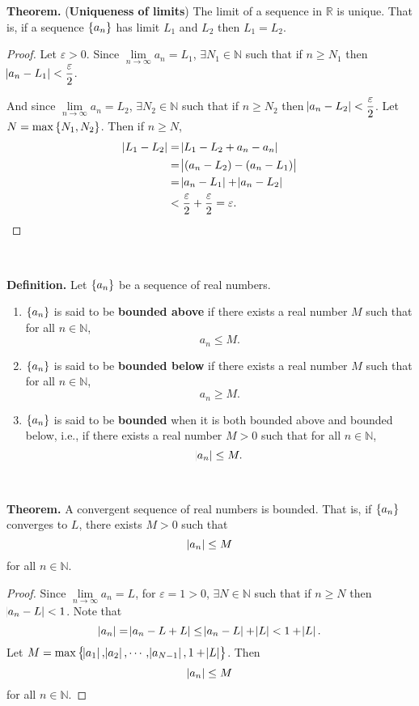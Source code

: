 \documentclass[12pt,a4paper]{article}
\newcommand{\dispsty}{\displaystyle}
\begin{document}
\begin{tcolorbox}[colback=white]
	\textbf{Theorem.} (\textbf{Uniqueness of limits}) The limit of a sequence in $\mathbb{R}$ is unique. That is, if a sequence $\set{a_n}$ has limit $L_1$ and $L_2$ then $L_1=L_2$.\tcblower\begin{proof}
		Let $\varepsilon>0$. Since $\lim\limits_{n\to\infty}a_n=L_1$, $\exists N_1\in\mathbb{N}$ such that if $n\geq N_1$ then $\dispsty\abs{a_n-L_1}<\frac{\varepsilon}{2}$. \par And since $\lim\limits_{n\to\infty}a_n=L_2$, $\exists N_2\in\mathbb{N}$ such that if $n\geq N_2$ then $\dispsty\abs{a_n-L_2}<\frac{\varepsilon}{2}$. Let $N=\max\set{N_1,N_2}$. Then if $n\geq N$, \begin{align*}
		\abs{L_1-L_2} &= \abs{L_1-L_2+a_n-a_n} \\
		&=\abs{(a_n-L_2)-(a_n-L_1)} \\
		&=\abs{a_n-L_1}+\abs{a_n-L_2} \\
		&<\frac{\varepsilon}{2}+\frac{\varepsilon}{2}=\varepsilon.
		\end{align*}
	\end{proof}
\end{tcolorbox}
\
\begin{tcolorbox}[colback=white]
	\textbf{Definition.} Let $\set{a_n}$ be a sequence of real numbers. \begin{enumerate}
		\item $\set{a_n}$ is said to be \textbf{bounded above} if there exists a real number $M$ such that for all $n\in\mathbb{N}$, \[
		a_n\leq M.
		\]
		\item $\set{a_n}$ is said to be \textbf{bounded below} if there exists a real number $M$ such that for all $n\in\mathbb{N}$, \[
		a_n\geq M.
		\]
		\item $\set{a_n}$ is said to be \textbf{bounded} when it is both bounded above and bounded below, i.e., if there exists a real number $M>0$ such that for all $n\in\mathbb{N}$, \[
		\abs{a_n}\leq M.
		\]
	\end{enumerate}
\end{tcolorbox}
\
\begin{tcolorbox}[colback=white]
	\textbf{Theorem.} A convergent sequence of real numbers is bounded. That is, if $\set{a_n}$ converges to $L$, there exists $M>0$ such that \[
	\abs{a_n}\leq M
	\] for all $n\in\mathbb{N}$.
	\tcblower\begin{proof}
		Since $\lim\limits_{n\to\infty}a_n=L$, for $\varepsilon=1>0$, $\exists N\in\mathbb{N}$ such that if $n\geq N$ then $\abs{a_n-L}<1$. Note that \[
		\abs{a_n}=\abs{a_n-L+L}\leq\abs{a_n-L}+\abs{L}<1+\abs{L}.
		\] Let $M=\max\set{\abs{a_1},\abs{a_2},\cdots,\abs{a_{N-1}}, 1+\abs{L}}$. Then \[
		\abs{a_n}\leq M
		\] for all $n\in\mathbb{N}$.
	\end{proof}
\end{tcolorbox}
\end{document}
